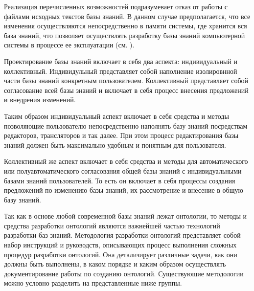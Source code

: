 Реализация перечисленных возможностей подразумевает отказ от работы с файлами исходных текстов базы знаний. В данном случае предполагается, что все изменения осуществляются непосредственно в памяти системы, где хранится вся база знаний, что позволяет осуществлять разработку базы знаний компьютерной системы в процессе ее эксплуатации (см. ).


Проектирование базы знаний включает в себя два аспекта: индивидуальный и коллективный.
Индивидульный представляет собой наполнение изолировнной части базы знаний конкретным пользователем.
Коллективный представляет собой согласование всей базы знаний и включает в себя процесс внесения предложений и внедрения изменений.

Таким образом индивидуальный аспект включает в себя средства и методы позволяющие пользователю непосредственно наполнять базу знаний посредствам редакторов, трансляторов и так далее. При этом процесс редактирования базы знаний должен быть максимально удобным и понятным для пользователя.

Коллективный же аспект включает в себя средства и методы для автоматического или полуавтоматического согласования общей базы знаний с индивидуальными базами знаний пользователей. То есть он включает в себя процессы создания предложений по изменению базы знаний, их рассмотрение и внесение в общую базу знаний.

Так как в основе любой современной базы знаний лежат онтологии, то методы и средства разработки онтологий являются важнейшей частью технологий разработки баз знаний.
Методология разработки онтологий представляет собой набор инструкций и руководств, описывающих процесс выполнения сложных процедур разработки онтологий.
Она детализирует различные задачи, как они должны быть выполнены, в каком порядке и каким образом осуществлять документирование работы по созданию онтологий.
Существующие методологии можно условно разделить на представленные ниже группы.

